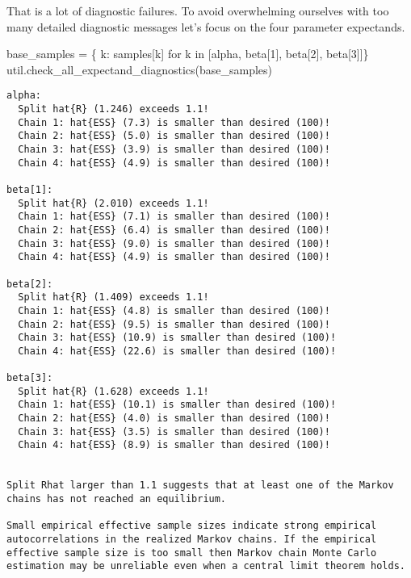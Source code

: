\documentclass[
  letterpaper,
  DIV=11,
  numbers=noendperiod]{scrartcl}
\newenvironment{Shaded}{\begin{snugshade}}{\end{snugshade}}
\newcommand{\ControlFlowTok}[1]{\textcolor[rgb]{0.00,0.23,0.31}{#1}}
\newcommand{\KeywordTok}[1]{\textcolor[rgb]{0.00,0.23,0.31}{#1}}
\newcommand{\NormalTok}[1]{\textcolor[rgb]{0.00,0.23,0.31}{#1}}
\newcommand{\OperatorTok}[1]{\textcolor[rgb]{0.37,0.37,0.37}{#1}}
\newcommand{\StringTok}[1]{\textcolor[rgb]{0.13,0.47,0.30}{#1}}
\begin{document}
That is a lot of diagnostic failures. To avoid overwhelming ourselves
with too many detailed diagnostic messages let's focus on the four
parameter expectands.

\begin{Shaded}
\begin{Highlighting}[]
\NormalTok{base\_samples }\OperatorTok{=}\NormalTok{ \{ k: samples[k] }\ControlFlowTok{for}\NormalTok{ k }\KeywordTok{in} 
\NormalTok{                 [}\StringTok{\textquotesingle{}alpha\textquotesingle{}}\NormalTok{, }\StringTok{\textquotesingle{}beta[1]\textquotesingle{}}\NormalTok{, }\StringTok{\textquotesingle{}beta[2]\textquotesingle{}}\NormalTok{, }\StringTok{\textquotesingle{}beta[3]\textquotesingle{}}\NormalTok{]\}}
\NormalTok{util.check\_all\_expectand\_diagnostics(base\_samples)}
\end{Highlighting}
\end{Shaded}

\begin{verbatim}
alpha:
  Split hat{R} (1.246) exceeds 1.1!
  Chain 1: hat{ESS} (7.3) is smaller than desired (100)!
  Chain 2: hat{ESS} (5.0) is smaller than desired (100)!
  Chain 3: hat{ESS} (3.9) is smaller than desired (100)!
  Chain 4: hat{ESS} (4.9) is smaller than desired (100)!

beta[1]:
  Split hat{R} (2.010) exceeds 1.1!
  Chain 1: hat{ESS} (7.1) is smaller than desired (100)!
  Chain 2: hat{ESS} (6.4) is smaller than desired (100)!
  Chain 3: hat{ESS} (9.0) is smaller than desired (100)!
  Chain 4: hat{ESS} (4.9) is smaller than desired (100)!

beta[2]:
  Split hat{R} (1.409) exceeds 1.1!
  Chain 1: hat{ESS} (4.8) is smaller than desired (100)!
  Chain 2: hat{ESS} (9.5) is smaller than desired (100)!
  Chain 3: hat{ESS} (10.9) is smaller than desired (100)!
  Chain 4: hat{ESS} (22.6) is smaller than desired (100)!

beta[3]:
  Split hat{R} (1.628) exceeds 1.1!
  Chain 1: hat{ESS} (10.1) is smaller than desired (100)!
  Chain 2: hat{ESS} (4.0) is smaller than desired (100)!
  Chain 3: hat{ESS} (3.5) is smaller than desired (100)!
  Chain 4: hat{ESS} (8.9) is smaller than desired (100)!


Split Rhat larger than 1.1 suggests that at least one of the Markov
chains has not reached an equilibrium.
 
Small empirical effective sample sizes indicate strong empirical
autocorrelations in the realized Markov chains. If the empirical
effective sample size is too small then Markov chain Monte Carlo
estimation may be unreliable even when a central limit theorem holds.
 
\end{verbatim}
\end{document}

